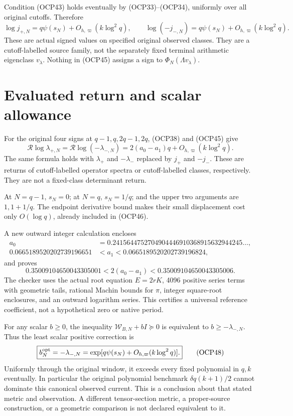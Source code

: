\documentclass[10pt]{article}
\newcommand{\Rr}{\mathcal R}\newcommand{\tr}{\operatorname{Tr}}
\begin{document}
Condition (OCP43) holds eventually by (OCP33)--(OCP34), uniformly over all original cutoffs. Therefore
\[
 \boxed{\log j_{+,N}=q\psi(s_N)+O_{h,\varpi}(k\log^2q),\qquad
 \log(-j_{-,N})=q\psi(s_N)+O_{h,\varpi}(k\log^2q).}
 \tag{OCP45}
\]
These are actual signed values on specified original observed classes. They are a cutoff-labelled source family, not the separately fixed terminal arithmetic eigenclass $v_\lambda$. Nothing in (OCP45) assigns a sign to $\Phi_N(\Lambda v_\lambda)$.

\section{Evaluated return and scalar allowance}
For the original four signs at $q-1,q,2q-1,2q$, (OCP38) and (OCP45) give
\[
 \boxed{\Rr\log\lambda_{+,N}
 =\Rr\log(-\lambda_{-,N})
 =2(a_0-a_1)q+O_{h,\varpi}(k\log^2q).}
 \tag{OCP46}
\]
The same formula holds with $\lambda_+$ and $-\lambda_-$ replaced by $j_+$ and $-j_-$. These are returns of cutoff-labelled operator spectra or cutoff-labelled classes, respectively. They are not a fixed-class determinant return.

At $N=q-1$, $s_N=0$; at $N=q$, $s_N=1/q$; and the upper two arguments are $1,1+1/q$. The endpoint derivative bound makes their small displacement cost only $O(\log q)$, already included in (OCP46).

A new outward integer calculation encloses
\[
\begin{split}
a_0&=0.2415644752704904446910368915632944245\ldots,\\
0.0665189520202739196651&<a_1<0.0665189520202739196824,
\end{split}
\]
and proves
\[
 \boxed{0.35009104650043305001
 <2(a_0-a_1)<0.35009104650043305006.}
 \tag{OCP47}
\]
The checker uses the actual root equation $E=2rK$, 4096 positive series terms with geometric tails, rational Machin bounds for $\pi$, integer square-root enclosures, and an outward logarithm series. This certifies a universal reference coefficient, not a hypothetical zero or native period.

For any scalar $b\ge0$, the inequality $\mathscr W_{B,N}+bI\succeq0$ is equivalent to $b\ge-\lambda_{-,N}$. Thus the least scalar positive correction is
\[
 \boxed{b_N^{\rm opt}=-\lambda_{-,N}
 =\exp[q\psi(s_N)+O_{h,\varpi}(k\log^2q)].}
 \tag{OCP48}
\]
Uniformly through the original window, it exceeds every fixed polynomial in $q,k$ eventually. In particular the original polynomial benchmark $\delta q(k+1)/2$ cannot dominate this canonical observed current. This is a conclusion about that stated metric and observation. A different tensor-section metric, a proper-source construction, or a geometric comparison is not declared equivalent to it.
\end{document}
